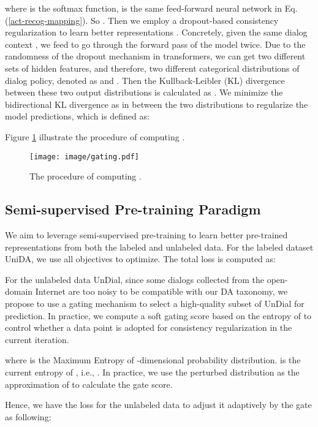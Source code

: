 \documentclass[letterpaper]{article} \usepackage{aaai22}  \usepackage{times}  \usepackage{helvet}  \usepackage{courier}  \usepackage[hyphens]{url}  \usepackage{graphicx} \urlstyle{rm} \def\UrlFont{\rm}  \usepackage{natbib}  \usepackage{caption} \DeclareCaptionStyle{ruled}{labelfont=normalfont,labelsep=colon,strut=off} \frenchspacing  \setlength{\pdfpagewidth}{8.5in}  \setlength{\pdfpageheight}{11in}  \usepackage{algorithm}
\begin{document}
where  is the softmax function,  is the same feed-forward neural network in Eq. (\ref{act-recog-mapping}). So . 
Then we employ a dropout-based consistency regularization to learn better representations \cite{gao2021simcse}. 
Concretely, given the same dialog context , we feed  to go through the forward pass of the model twice. Due to the randomness of the dropout mechanism in transformers, we can get two different sets of hidden features, and therefore, two different categorical distributions of dialog policy, denoted as  and .
Then the Kullback-Leibler (KL) divergence between these two output distributions is calculated as .
We minimize the bidirectional KL divergence as in \cite{liang2021r} between the two distributions to regularize the model predictions, which is defined as:

Figure \ref{fig:gating} illustrate the procedure of computing . 



\begin{figure}[t]
    \centering
    \texttt{[image: image/gating.pdf]}
    \caption{The procedure of computing .}
    \label{fig:gating}
\end{figure}

\subsection{Semi-supervised Pre-training Paradigm}

We aim to leverage semi-supervised pre-training to learn better pre-trained representations from both the labeled and unlabeled data. For the labeled dataset UniDA, we use all objectives to optimize. 
The total loss  is computed as:


For the unlabeled data UnDial, since some dialogs collected from the open-domain Internet are too noisy to be compatible with our DA taxonomy, we propose to use a gating mechanism to select a high-quality subset of UnDial for prediction.
In practice, we compute a soft gating score  based on the entropy of  to control whether a data point is adopted for consistency regularization in the current iteration. 

where  is the Maximum Entropy of -dimensional probability distribution.  is the current entropy of , i.e., . In practice, we use the perturbed distribution  as the approximation of  to calculate the gate score. 


Hence, we have the loss  for the unlabeled data to adjust it adaptively by the gate  as following:
\end{document}
